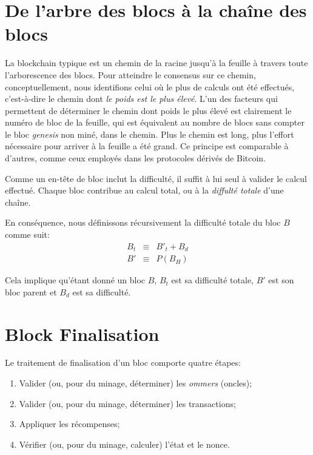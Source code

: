 \documentclass[9pt,oneside]{amsart}
\begin{document}
\begin{multicols}{2}
\section{De l'arbre des blocs à la chaîne des blocs} \label{ch:ghost}

La blockchain typique est un chemin de la racine jusqu'à la feuille à travers toute l'arborescence des blocs. Pour atteindre le consensus sur ce chemin, conceptuellement, nous identifions celui où le plus de calculs ont été effectués, c'est-à-dire le chemin dont \textit{le poids est le plus élevé}. L'un des facteurs qui permettent de déterminer le chemin dont poids le plus élevé est clairement le numéro de bloc de la feuille, qui est équivalent au nombre de blocs sans compter le bloc \textit{genesis} non miné, dans le chemin. Plus le chemin est long, plus l'effort nécessaire pour arriver à la feuille a été grand. Ce principe est comparable à d'autres, comme ceux employés dans les protocoles dérivés de Bitcoin.

Comme un en-tête de bloc inclut la difficulté, il suffit à lui seul à valider le calcul effectué. Chaque bloc contribue au calcul total, ou à la \textit{diffulté totale} d'une chaîne.

En conséquence, nous définissons récursivement la difficulté totale du bloc $B$ comme suit:
\begin{eqnarray}
B_t & \equiv & B'_t + B_d \\
B' & \equiv & P(B_H)
\end{eqnarray}

Cela implique qu'étant donné un bloc $B$, $B_t$ est sa difficulté totale, $B'$ est son bloc parent et $B_d$ est sa difficulté.

\section{Block Finalisation} \label{ch:finalisation}

Le traitement de finalisation d'un bloc comporte quatre étapes:

\begin{enumerate}
\item Valider (ou, pour du minage, déterminer) les \textit{ommers} (oncles);
\item Valider (ou, pour du minage, déterminer) les transactions;
\item Appliquer les récompenses;
\item Vérifier (ou, pour du minage, calculer) l'état et le nonce.
\end{enumerate}


\end{multicols}
\end{document}
